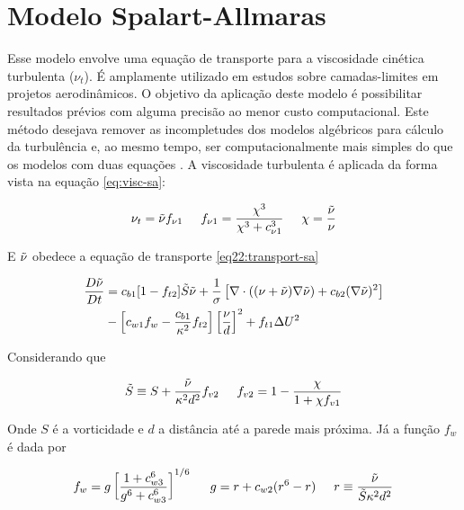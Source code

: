 \section{Modelo Spalart-Allmaras}

Esse modelo \cite{Spalart1992} envolve uma equação de transporte para a viscosidade cinética turbulenta ($\nu_t$). É amplamente utilizado em estudos sobre camadas-limites em projetos aerodinâmicos. O objetivo da aplicação deste modelo é possibilitar resultados prévios com alguma precisão ao menor custo computacional. Este método desejava remover as incompletudes dos modelos algébricos para cálculo da turbulência e, ao mesmo tempo, ser computacionalmente mais simples do que os modelos com duas equações \cite{pope_2000}. A viscosidade turbulenta é aplicada da forma vista na equação \ref{eq:visc-sa}:

\begin{equation}
    \label{eq:visc-sa}
    \nu_t = \Tilde{\nu} f_{\nu 1} \hspace{5mm} f_{\nu 1} = \frac{\chi^3}{\chi^3 + c^{3}_{\nu 1}} \hspace{5mm} \chi = \frac{\Tilde{\nu}}{\nu}
\end{equation}

E $\Tilde{\nu}$ obedece a equação de transporte \ref{eq22:transport-sa}

\begin{equation}\label{eq22:transport-sa}
\begin{split}
    \frac{D\Tilde{\nu}}{Dt} &= c_{b1}[1 - f_{t2}]\Tilde{S}\Tilde{\nu} + \frac{1}{\sigma}\left[\nabla \cdot ((\nu + \Tilde{\nu})\nabla \Tilde{\nu}) + c_{b2}(\nabla \Tilde{\nu})^2 \right] \\&- \left[c_{w1}f_w - \frac{c_{b1}}{\kappa^2}f_{t2}\right]\left[\frac{\nu}{d}\right]^2 + f_{t1}\Delta U^2
\end{split}
\end{equation}

Considerando que

\begin{equation}
    \Tilde{S} \equiv S + \frac{\Tilde{\nu}}{\kappa^2d^2}f_{v2} \hspace{5mm} f_{v2} = 1 - \frac{\chi}{1 + \chi f_{v1}}
\end{equation}

Onde $S$ é a vorticidade e $d$ a distância até a parede mais próxima. Já a função $f_{w}$ é dada por

\begin{equation}
    f_w = g\left[\frac{1 + c^{6}_{w3}}{g^6 + c^{6}_{w3}} \right]^{1/6} \hspace{5mm} g = r + c_{w2}(r^6 - r) \hspace{5mm} r \equiv \frac{\Tilde{\nu}}{\Tilde{S}\kappa^2d^2}
\end{equation}

